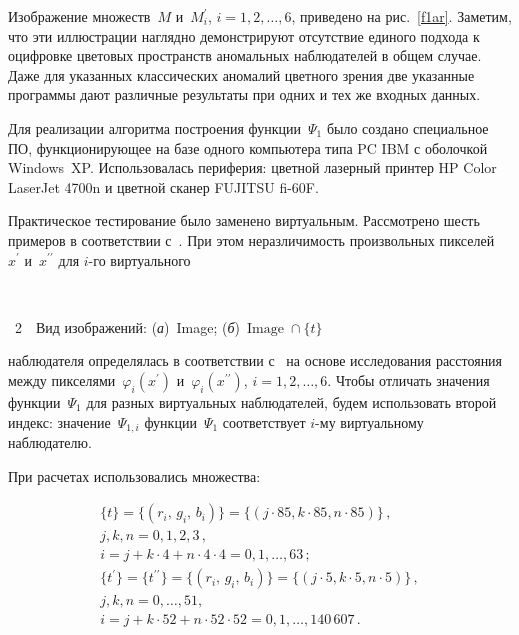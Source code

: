 \begin{multicols}{2}
  Изображение множеств~$M$ и~$M^\prime_i$, $i = 1, 2, \ldots , 6$, приведено 
на рис.~\ref{f1ar}. Заметим, что эти иллюстрации наглядно демонстрируют 
отсутствие единого подхода к оцифровке цветовых пространств аномальных 
наблюдателей в общем случае. Даже для указанных классических аномалий 
цветного зрения две указанные программы дают различные результаты при 
одних и тех же входных данных.
  
  Для реализации алгоритма построения функции~$\Psi_1$ было создано 
специальное ПО, функционирующее на базе одного компьютера типа PC IBM с 
оболочкой Windows~XP. Использовалась периферия: цветной лазерный 
принтер HP Color LaserJet 4700n и цветной сканер FUJITSU fi-60F.



  Практическое тестирование было заменено виртуальным. Рассмотрено шесть 
примеров в соответствии с~\cite{5ar, 6ar}. При этом неразличимость 
произвольных пикселей~$x^\prime$ и~$x^{\prime\prime}$ для $i$-го 
виртуального\linebreak
\begin{center} %
\vspace*{6pt}
\mbox{%
\epsfxsize=41.275mm
}
\end{center}
\vspace*{4pt}
\begin{center}
{{\figurename~2}\ \ \small{Вид изображений: (\textit{а})~Image; (\textit{б})~$\mathrm{Image}\;\cap\{t\}$}}
\end{center}

\bigskip
\addtocounter{figure}{1}


\noindent
 наблюдателя определялась в соответствии с~\cite{11ar} на
основе 
исследования расстояния между пикселями~$\varphi_i(x^\prime)$ 
и~$\varphi_i(x^{\prime\prime})$, $i=1, 2, \ldots , 6$. Чтобы отличать значения 
функции~$\Psi_1$ для разных виртуальных наблюдателей, будем использовать 
второй индекс: значение~$\Psi_{1,i}$ функции~$\Psi_1$ соответствует $i$-му 
виртуальному наблюдателю.
  
  При расчетах использовались множества:
  
  \noindent
  \begin{gather*}
\{t\} = \{(r_i,\,g_i,\,b_i)\} = \{(j\cdot85, k\cdot85, n\cdot85)\}\,,\\
j,k,n = 0, 1, 2,  3\,,\\
i=j+k\cdot4+n\cdot4\cdot4=0,1, \ldots , 63\,;\\
\{t^\prime\} = \{t^{\prime\prime}\} = \{(r_i,\,g_i,\,b_i)\} = \{(j\cdot5, k\cdot5, 
n\cdot5)\}\,,\\
j,k,n = 0, \ldots , 51,\\
i=j+k\cdot52+n\cdot52\cdot52=0,1, \ldots , 140\,607\,. 
\end{gather*}
  

\end{multicols}
